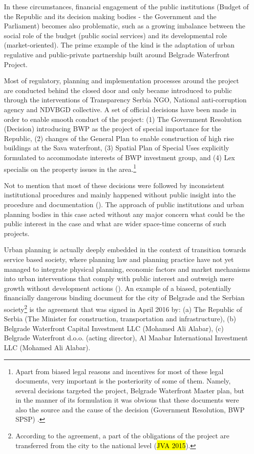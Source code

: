 \documentclass[11pt]{report}
\begin{document}
In these circumstances, financial engagement of the public institutions (Budget of the Republic and its decision making bodies - the Government and the Parliament) becomes also problematic, such as a growing imbalance between the social role of the budget (public social services) and its developmental role (market-oriented).
The prime example of the kind is the adaptation of urban regulative and public-private partnership built around Belgrade Waterfront Project.

Most of regulatory, planning and implementation processes around the project are conducted behind the closed door and only became introduced to public through the interventions of Transparency Serbia NGO, National anti-corruption agency and NDVBGD collective.
A set of official decisions have been made in order to enable smooth conduct of the project:
(1) The Government Resolution (Decision) introducing BWP as the project of special importance for the Republic,
(2) changes of the General Plan to enable construction of high rise buildings at the Sava waterfront,
(3) Spatial Plan of Special Uses explicitly formulated to accommodate interests of BWP investment group,
and
(4) Lex specialis on the property issues in the area.\footnote{Apart from biased legal reasons and incentives for most of these legal documents, very important is the posteriority of some of them. Namely, several decisions targeted the project, Belgrade Waterfront Master plan, but in the manner of its formulation it was obvious that these documents were also the source and the cause of the decision (Government Resolution, BWP SPSP) \cite{Alternativni izvestaj}.}

Not to mention that most of these decisions were followed by inconsistent institutional procedures and mainly happened without public insight into the procedure and documentation (\cite{alternativni izvestaj}).
The approach of public institutions and urban planning bodies in this case acted without any major concern what could be the public interest in the case and what are wider space-time concerns of such projects.

Urban planning is actually deeply embedded in the context of transition towards service based society, where planning law and planning practice have not yet managed to integrate physical planning, economic factors and market mechanisms into urban interventions that comply with public interest and outweigh mere growth without development actions (\cite{Vujosevic 2012}).
An example of a biased, potentially financially dangerous binding document for the city of Belgrade and the Serbian society\footnote{
According to the agreement, a part of the obligations of the project are transferred from the city to the national level (\hl{JVA 2015}).}
is the agreement that was signed in April 2016 by:
(a) The Republic of Serbia (The Minister for construction, transportation and infrastructure),
(b) Belgrade Waterfront Capital Investment LLC (Mohamed Ali Alabar),
(c) Belgrade Waterfront d.o.o. (acting director),
Al Maabar International Investment LLC (Mohamed Ali Alabar).
\end{document}
